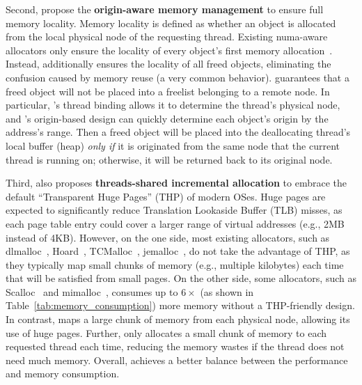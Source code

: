 Second, \NM{} propose the \textbf{origin-aware memory management} to ensure full memory locality. Memory locality is defined as whether an object is allocated from the local physical node of the requesting thread. Existing numa-aware allocators only ensure the locality of every object's first memory allocation~\cite{tcmallocnew, kim2013node, yang2019jarena, mimalloc}.  Instead, \NM{} additionally ensures the locality of all freed objects, eliminating the confusion caused by memory reuse (a very common behavior). \NM{} guarantees that a freed object will not be placed into a freelist belonging to a remote node. In particular, \NM{}'s thread binding allows it to determine the thread's physical node, and \NM{}'s origin-based design can quickly determine each object's origin by the address's range. Then a freed object will be placed into the deallocating thread's local buffer (heap) \textit{only if} it is originated from the same node that the current thread is running on; otherwise, it will be returned back to its original node. 

Third, \NM{} also proposes \textbf{threads-shared incremental allocation} to embrace the default ``Transparent Huge Pages'' (THP) of modern OSes. Huge pages are expected to significantly reduce Translation Lookaside Buffer (TLB) misses, as each page table entry could cover a larger range of virtual addresses (e.g., 2MB instead of 4KB). However, on the one side, most existing allocators, such as dlmalloc~\cite{dlmalloc},  Hoard~\cite{Hoard}, TCMalloc~\cite{tcmalloc}, jemalloc~\cite{jemalloc}, do not take the advantage of THP, as they typically map small chunks of memory (e.g., multiple kilobytes) each time that will be satisfied from small pages. On the other side, some allocators, such as Scalloc~\cite{Scalloc} and mimalloc~\cite{mimalloc}, consumes up to $6\times$ (as shown in Table~\ref{tab:memory_consumption}) more memory without a THP-friendly design. In contrast, \NM{} maps a large chunk of memory from each physical node, allowing its use of huge pages. Further, \NM{} only allocates a small chunk of memory to each requested thread each time, reducing the memory wastes if the thread does not need  much memory. Overall, \NM{} achieves a better balance between the performance and memory consumption. 

